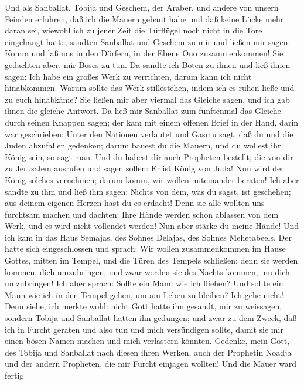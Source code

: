  Und als Sanballat, Tobija und Geschem, der Araber, und
andere von unsern Feinden erfuhren, daß ich die Mauern gebaut habe und
daß keine Lücke mehr daran sei, wiewohl ich zu jener Zeit die Türflügel
noch nicht in die Tore eingehängt hatte,  sandten
Sanballat und Geschem zu mir und ließen mir sagen: Komm und laß uns in
den Dörfern, in der Ebene Ono zusammenkommen! Sie gedachten aber, mir
Böses zu tun.  Da sandte ich Boten zu ihnen und ließ ihnen
sagen: Ich habe ein großes Werk zu verrichten, darum kann ich nicht
hinabkommen. Warum sollte das Werk stillestehen, indem ich es ruhen
ließe und zu euch hinabkäme?  Sie ließen mir aber viermal
das Gleiche sagen, und ich gab ihnen die gleiche Antwort. 
Da ließ mir Sanballat zum fünftenmal das Gleiche durch seinen Knappen
sagen; der kam mit einem offenen Brief in der Hand, darin war
geschrieben:  Unter den Nationen verlautet und Gasmu sagt,
daß du und die Juden abzufallen gedenken; darum bauest du die Mauern,
und du wollest ihr König sein, so sagt man.  Und du habest
dir auch Propheten bestellt, die von dir zu Jerusalem ausrufen und sagen
sollen: Er ist König von Juda! Nun wird der König solches vernehmen;
darum komm, wir wollen miteinander beraten!  Ich aber
sandte zu ihm und ließ ihm sagen: Nichts von dem, was du sagst, ist
geschehen; aus deinem eigenen Herzen hast du es erdacht! 
Denn sie alle wollten uns furchtsam machen und dachten: Ihre Hände
werden schon ablassen von dem Werk, und es wird nicht vollendet werden!
Nun aber stärke du meine Hände!  Und ich kam in das Haus
Semajas, des Sohnes Delajas, des Sohnes Mehetabeels. Der hatte sich
eingeschlossen und sprach: Wir wollen zusammenkommen im Hause Gottes,
mitten im Tempel, und die Türen des Tempels schließen; denn sie werden
kommen, dich umzubringen, und zwar werden sie des Nachts kommen, um dich
umzubringen!  Ich aber sprach: Sollte ein Mann wie ich
fliehen? Und sollte ein Mann wie ich in den Tempel gehen, um am Leben zu
bleiben? Ich gehe nicht!  Denn siehe, ich merkte wohl:
nicht Gott hatte ihn gesandt, mir zu weissagen, sondern Tobija und
Sanballat hatten ihn gedungen;  und zwar zu dem Zweck,
daß ich in Furcht geraten und also tun und mich versündigen sollte,
damit sie mir einen bösen Namen machen und mich verlästern könnten.
 Gedenke, mein Gott, des Tobija und Sanballat nach diesen
ihren Werken, auch der Prophetin Noadja und der andern Propheten, die
mir Furcht einjagen wollten!  Und die Mauer ward fertig
